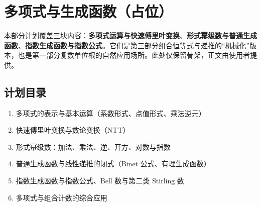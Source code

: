 %
%

\chapter{多项式与生成函数（占位）}
\begin{chapterintro}[章节导读]
本部分计划覆盖三块内容：\textbf{多项式运算与快速傅里叶变换}、\textbf{形式幂级数与普通生成函数}、\textbf{指数生成函数与指数公式}。它们是第三部分组合恒等式与递推的“机械化”版本，也是第一部分复数单位根的自然应用场所。此处仅保留骨架，正文由使用者提供。
\end{chapterintro}

\section{计划目录}
\begin{enumerate}
\item 多项式的表示与基本运算（系数形式、点值形式、乘法逆元）
\item 快速傅里叶变换与数论变换（NTT）
\item 形式幂级数：加法、乘法、逆、开方、对数与指数
\item 普通生成函数与线性递推的闭式（Binet 公式、有理生成函数）
\item 指数生成函数与指数公式、Bell 数与第二类 Stirling 数
\item 多项式与组合计数的综合应用
\end{enumerate}

